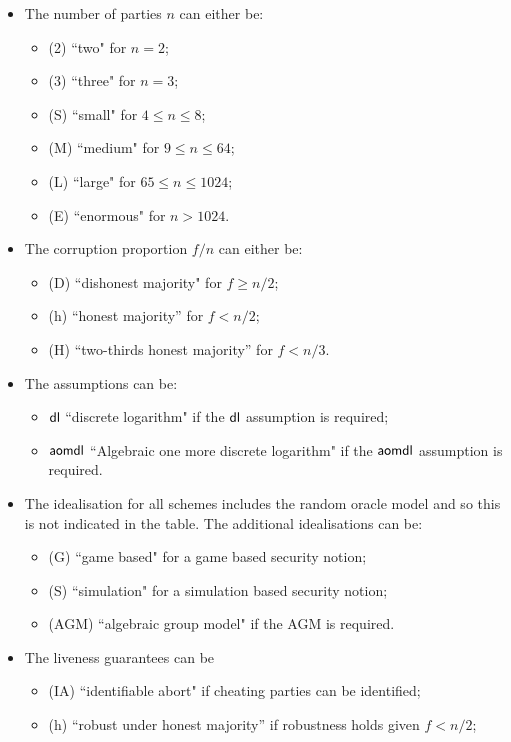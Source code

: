 \begin{itemize}
	\item The number of parties $n$ can either be:
	\begin{itemize}
		\item (2) ``two" for $n = 2$;
		\item (3) ``three" for $n = 3$;
		\item  (S) ``small" for $4 \leq n \leq 8$;
		\item  (M) ``medium" for $9 \leq n \leq 64$;
		\item (L) ``large" for $65 \leq n \leq 1024$; 
		\item (E) ``enormous" for $n > 1024$.
	\end{itemize}
	\item The corruption proportion $f/n$ can either be:  
		\begin{itemize}
			\item  (D) ``dishonest majority" for $f \geq n/2$; 
			\item  (h) ``honest majority” for $f < n/2$; 
			\item (H) “two-thirds honest majority” for $f < n/3$.
	\end{itemize}
	\item The assumptions can  be:
		\begin{itemize}
			\item $\mathsf{dl}$ ``discrete logarithm" if the $\mathsf{dl}$ assumption is required;
			\item $\mathsf{aomdl}$ ``Algebraic one more discrete logarithm" if the $\mathsf{aomdl}$ assumption is required.
		\end{itemize}
	\item 	The idealisation for all schemes includes the random oracle model and so this is not indicated in the table.  The additional idealisations can be:
		\begin{itemize}
			\item (G)  ``game based" for a game based security notion;
			\item (S) ``simulation" for a simulation based security notion;
			\item (AGM) ``algebraic group model" if the AGM is required.
		\end{itemize} 
 	\item The liveness guarantees can be
 		\begin{itemize}
 			\item  (IA) ``identifiable abort" if cheating parties can be identified;
 			\item  (h) ``robust under honest majority” if robustness holds given $f < n/2$;

\end{itemize}
\end{itemize}
